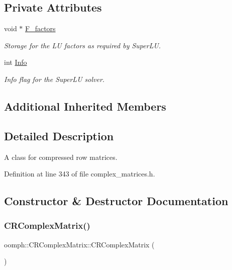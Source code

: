\subsection*{Private Attributes}
\begin{DoxyCompactItemize}
\item 
void $\ast$ \hyperlink{classoomph_1_1CRComplexMatrix_a1c005b277efb26453ac04d753378946f}{F\+\_\+factors}
\begin{DoxyCompactList}\small\item\em Storage for the LU factors as required by Super\+LU. \end{DoxyCompactList}\item 
int \hyperlink{classoomph_1_1CRComplexMatrix_adb7e147717d66f466c46178a403fe630}{Info}
\begin{DoxyCompactList}\small\item\em Info flag for the Super\+LU solver. \end{DoxyCompactList}\end{DoxyCompactItemize}
\subsection*{Additional Inherited Members}


\subsection{Detailed Description}
A class for compressed row matrices. 

Definition at line 343 of file complex\+\_\+matrices.\+h.



\subsection{Constructor \& Destructor Documentation}
\mbox{\label{classoomph_1_1CRComplexMatrix_aafc13fb96931fb4d62bad6c3146602af}} 
\subsubsection{\texorpdfstring{C\+R\+Complex\+Matrix()}{CRComplexMatrix()}\hspace{0.1cm}{\footnotesize\ttfamily [1/3]}}
{\footnotesize\ttfamily oomph\+::\+C\+R\+Complex\+Matrix\+::\+C\+R\+Complex\+Matrix (\begin{DoxyParamCaption}{ }\end{DoxyParamCaption})\hspace{0.3cm}{\ttfamily [inline]}}



